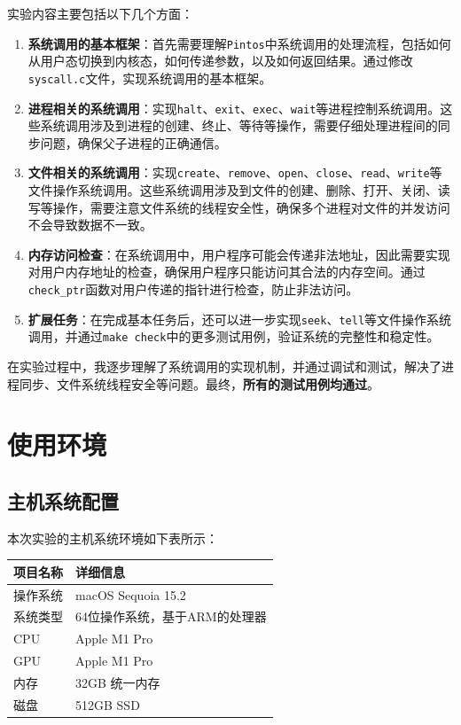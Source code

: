 \documentclass{article}
\begin{document}
实验内容主要包括以下几个方面：
\begin{enumerate}
	\item \textbf{系统调用的基本框架}：首先需要理解\texttt{Pintos}中系统调用的处理流程，包括如何从用户态切换到内核态，如何传递参数，以及如何返回结果。通过修改\texttt{syscall.c}文件，实现系统调用的基本框架。
	
	\item \textbf{进程相关的系统调用}：实现\texttt{halt}、\texttt{exit}、\texttt{exec}、\texttt{wait}等进程控制系统调用。这些系统调用涉及到进程的创建、终止、等待等操作，需要仔细处理进程间的同步问题，确保父子进程的正确通信。
	
	\item \textbf{文件相关的系统调用}：实现\texttt{create}、\texttt{remove}、\texttt{open}、\texttt{close}、\texttt{read}、\texttt{write}等文件操作系统调用。这些系统调用涉及到文件的创建、删除、打开、关闭、读写等操作，需要注意文件系统的线程安全性，确保多个进程对文件的并发访问不会导致数据不一致。
	
	\item \textbf{内存访问检查}：在系统调用中，用户程序可能会传递非法地址，因此需要实现对用户内存地址的检查，确保用户程序只能访问其合法的内存空间。通过\texttt{check\_ptr}函数对用户传递的指针进行检查，防止非法访问。
	
	\item \textbf{扩展任务}：在完成基本任务后，还可以进一步实现\texttt{seek}、\texttt{tell}等文件操作系统调用，并通过\texttt{make check}中的更多测试用例，验证系统的完整性和稳定性。
\end{enumerate}

在实验过程中，我逐步理解了系统调用的实现机制，并通过调试和测试，解决了进程同步、文件系统线程安全等问题。最终，\textbf{所有的测试用例均通过}。

\section{使用环境}

\subsection{主机系统配置}

本次实验的主机系统环境如下表所示：

\begin{center}
	\begin{tabular}{| >{\centering\arraybackslash}m{3cm} | >{\centering\arraybackslash}m{7cm} |}    
		\hline  
		\textbf{项目名称} & \textbf{详细信息} \\
		\hline  
		操作系统 & macOS Sequoia 15.2 \\  
		\hline  
		系统类型 & 64位操作系统，基于ARM的处理器 \\  
		\hline
		CPU & Apple M1 Pro \\  
		\hline 
		GPU & Apple M1 Pro\\  
		\hline 
		内存 & 32GB 统一内存 \\  
		\hline 
		磁盘 & 512GB SSD \\  
		\hline 		
	\end{tabular}
\end{center}
\end{document}
